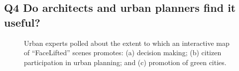 \subsection*{Q4 Do architects and urban planners find it useful?}

\begin{figure}[!t]
	\centering
	\hspace*{-5mm}
	\caption{Urban experts polled about the extent to which an interactive map of ``FaceLifted'' scenes promotes: (a) decision making; (b) citizen participation in urban planning; and (c) promotion of green cities.}
	\label{fig:pies}
	\vspace{-0.4cm}
\end{figure}



